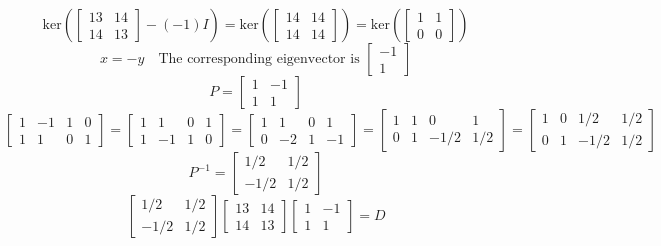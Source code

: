 \documentclass[hidelinks]{article}
\begin{document}
\[
	\text{ker}(\begin{bmatrix} 13 & 14 \\ 14 & 13 \end{bmatrix} - (-1) I) = \text{ker}(\begin{bmatrix} 14 & 14 \\ 14 & 14 \end{bmatrix})
= \text{ker}(\begin{bmatrix} 1 & 1 \\ 0 & 0 \end{bmatrix})
\]
\[
	x = -y \quad \text{The corresponding eigenvector is }\begin{bmatrix} -1 \\ 1 \end{bmatrix}
\]
\[
	P = \begin{bmatrix} 1 & -1 \\ 1 & 1 \end{bmatrix} 
\]
\[
	\begin{bmatrix} 1 & -1 & 1 & 0 \\ 1 & 1 & 0 & 1 \end{bmatrix} = 
	\begin{bmatrix} 1 & 1 & 0 & 1 \\ 1 & -1 & 1 & 0 \end{bmatrix} = 
	\begin{bmatrix} 1 & 1 & 0 & 1 \\ 0 & -2 & 1 & -1 \end{bmatrix} = 
	\begin{bmatrix} 1 & 1 & 0 & 1 \\ 0 & 1 & -1/2 & 1/2 \end{bmatrix} = 
	\begin{bmatrix} 1 & 0 & 1/2 & 1/2 \\ 0 & 1 & -1/2 & 1/2 \end{bmatrix}
\]
\[
	P^{-1} = 
	\begin{bmatrix} 1/2 & 1/2 \\ -1/2 & 1/2 \end{bmatrix}
\]
\[
	\begin{bmatrix} 1/2 & 1/2 \\ -1/2 & 1/2 \end{bmatrix} 	
	\begin{bmatrix} 13 & 14 \\ 14 & 13 \end{bmatrix}	
	\begin{bmatrix} 1 & -1 \\ 1 & 1 \end{bmatrix}= D			
\]
\end{document}
